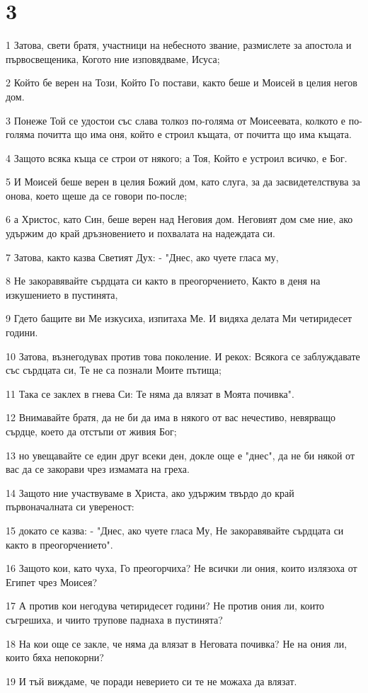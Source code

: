\chapter{3}

\par 1 Затова, свети братя, участници на небесното звание, размислете за апостола и първосвещеника, Когото ние изповядваме, Исуса;
\par 2 Който бе верен на Този, Който Го постави, както беше и Моисей в целия негов дом.
\par 3 Понеже Той се удостои със слава толкоз по-голяма от Моисеевата, колкото е по-голяма почитта що има оня, който е строил къщата, от почитта що има къщата.
\par 4 Защото всяка къща се строи от някого; а Тоя, Който е устроил всичко, е Бог.
\par 5 И Моисей беше верен в целия Божий дом, като слуга, за да засвидетелствува за онова, което щеше да се говори по-после;
\par 6 а Христос, като Син, беше верен над Неговия дом. Неговият дом сме ние, ако удържим до край дръзновението и похвалата на надеждата си.
\par 7 Затова, както казва Светият Дух: - "Днес, ако чуете гласа му,
\par 8 Не закоравявайте сърдцата си както в преогорчението, Както в деня на изкушението в пустинята,
\par 9 Гдето бащите ви Ме изкусиха, изпитаха Ме. И видяха делата Ми четиридесет години.
\par 10 Затова, възнегодувах против това поколение. И рекох: Всякога се заблуждавате със сърдцата си, Те не са познали Моите пътища;
\par 11 Така се заклех в гнева Си: Те няма да влязат в Моята почивка".
\par 12 Внимавайте братя, да не би да има в някого от вас нечестиво, невярващо сърдце, което да отстъпи от живия Бог;
\par 13 но увещавайте се един друг всеки ден, докле още е "днес", да не би някой от вас да се закорави чрез измамата на греха.
\par 14 Защото ние участвуваме в Христа, ако удържим твърдо до край първоначалната си увереност:
\par 15 докато се казва: - "Днес, ако чуете гласа Му, Не закоравявайте сърдцата си както в преогорчението".
\par 16 Защото кои, като чуха, Го преогорчиха? Не всички ли ония, които излязоха от Египет чрез Моисея?
\par 17 А против кои негодува четиридесет години? Не против ония ли, които съгрешиха, и чиито трупове паднаха в пустинята?
\par 18 На кои още се закле, че няма да влязат в Неговата почивка? Не на ония ли, които бяха непокорни?
\par 19 И тъй виждаме, че поради неверието си те не можаха да влязат.

